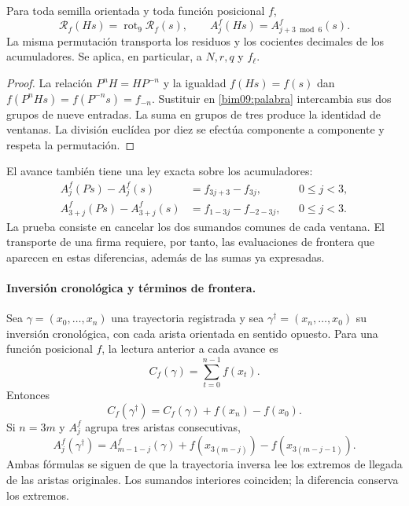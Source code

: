 \begin{proposition}
\label{bim09:media-vuelta}
Para toda semilla orientada y toda función posicional $f$,
\[
 \mathcal R_f(Hs)=\operatorname{rot}_9\mathcal R_f(s),\qquad
 A_j^f(Hs)=A_{j+3\bmod6}^f(s).
\]
La misma permutación transporta los residuos y los cocientes decimales
de los acumuladores. Se aplica, en particular, a $N,r,q$ y $f_\ell$.
\end{proposition}
\begin{proof}
La relación $P^nH=HP^{-n}$ y la igualdad $f(Hs)=f(s)$ dan
$f(P^nHs)=f(P^{-n}s)=f_{-n}$. Sustituir en
\eqref{bim09:palabra} intercambia sus dos grupos de nueve entradas.
La suma en grupos de tres produce la identidad de ventanas. La división
euclídea por diez se efectúa componente a componente y respeta la
permutación.
\end{proof}

El avance también tiene una ley exacta sobre los acumuladores:
\begin{align}
 A_j^f(Ps)-A_j^f(s)&=f_{3j+3}-f_{3j},&&0\leq j<3,
 \label{bim09:avance-ida}\\
 A_{3+j}^f(Ps)-A_{3+j}^f(s)&=f_{1-3j}-f_{-2-3j},&&0\leq j<3.
 \label{bim09:avance-vuelta}
\end{align}
La prueba consiste en cancelar los dos sumandos comunes de cada ventana.
El transporte de una firma requiere, por tanto, las evaluaciones de
frontera que aparecen en estas diferencias, además de las sumas ya
expresadas.

\paragraph{Inversión cronológica y términos de frontera.}

Sea $\gamma=(x_0,\ldots,x_n)$ una trayectoria registrada y sea
$\gamma^\dagger=(x_n,\ldots,x_0)$ su inversión cronológica, con cada
arista orientada en sentido opuesto. Para una función posicional $f$,
la lectura anterior a cada avance es
\[
 C_f(\gamma)=\sum_{t=0}^{n-1}f(x_t).
\]
Entonces
\begin{equation}
 C_f(\gamma^\dagger)=C_f(\gamma)+f(x_n)-f(x_0).
 \label{bim09:frontera-inversion}
\end{equation}
Si $n=3m$ y $A_j^f$ agrupa tres aristas consecutivas,
\begin{equation}
 A_j^f(\gamma^\dagger)=A_{m-1-j}^f(\gamma)
 +f(x_{3(m-j)})-f(x_{3(m-j-1)}).
 \label{bim09:frontera-ventana}
\end{equation}
Ambas fórmulas se siguen de que la trayectoria inversa lee los extremos
de llegada de las aristas originales. Los sumandos interiores coinciden;
la diferencia conserva los extremos.

